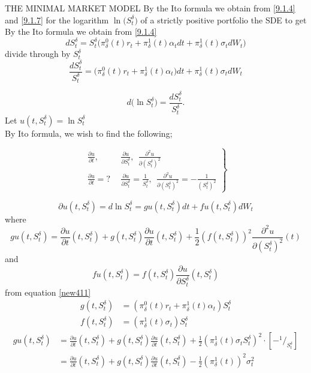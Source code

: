 \documentclass[unknownkeysallowed, compress]{beamer}
\newcommand*\rfrac[2]{{}^{#1}\!/_{#2}}
\theoremstyle{plain}
\begin{document}
\begin{frame}[allowframebreaks]{THE MINIMAL MARKET MODEL}
By the Ito formula we obtain from \eqref{9.1.4} and \eqref{9.1.7} for the logarithm $\ln\bigg(S_t^\delta\bigg)$ 
of a strictly positive portfolio the SDE to get
By the Ito formula we obtain from \eqref{9.1.4}
$$
dS_t^\delta = S_t^\delta\bigg(\pi_\delta^0(t)r_t+\pi_\delta^1(t)\alpha_tdt+\pi_\delta^1(t)\sigma_tdW_t\bigg)
$$
divide through by $S_t^\delta$
\begin{equation}\label{new411}
\frac{dS_t^\delta}{S_t^\delta} = \bigg(\pi_\delta^0(t)r_t+\pi^1_\delta(t)\alpha_t\bigg)dt+\pi_\delta^1(t)\sigma_tdW_t
\end{equation}

\begin{equation}
d\bigg(\ln S_t^\delta\bigg) =  \frac{dS_t^\delta}{S_t^\delta}.
\end{equation}
Let $u(t,S_t^\delta) = \ln S_t^\delta$\\
By Ito formula, we wish to find the following;

\begin{equation}
\left.
\begin{split}
\frac{\partial u}{\partial t},&~~\frac{\partial u}{\partial S_t^\delta},~~\frac{\partial^2u}{\partial(S_t^\delta)^2}\\
\frac{\partial u}{\partial t} = ? &~~\frac{\partial u}{\partial S_t^\delta} = \frac{1}{S_t^\delta},~~\frac{\partial^2u}{\partial(S_t^\delta)^2} = -\frac{1}{(S_t^\delta)^2}
\end{split}
\right\}
\end{equation}

\begin{equation}\label{new415}
\partial u(t,S_t^\delta) = d\ln S_t^\delta = gu(t,S_t^\delta)dt+fu(t,S_t^\delta)dW_t
\end{equation}
where
$$
gu(t,S_t^\delta) = \frac{\partial u}{\partial t}(t,S_t^\delta)+g(t,S_t^\delta)\frac{\partial u}{\partial t}(t,S_t^\delta)+\frac{1}{2}(f(t,S_t^\delta))^2\frac{\partial^2u}{\partial(S_t^\delta)^2}(t)
$$
and 
$$
fu(t,S_t^\delta) = f(t,S_t^\delta)\frac{\partial u}{\partial S_t^\delta}(t,S_t^\delta)
$$
from equation \eqref{new411}
\begin{align*}
g(t,S_t^\delta) & = (\pi^0_\delta(t)r_t+\pi_\delta^1(t)\alpha_t)S_t^\delta\\
f(t,S_t^\delta) & = (\pi^1_\delta(t)\sigma_t)S_t^\delta%
\end{align*}
\begin{equation}\label{new418}
\begin{split}
gu(t,S_t^\delta) & = \frac{\partial u}{\partial t}(t,S_t^\delta)+g(t,S_t^\delta)\frac{\partial u}{\partial t}(t,S_t^\delta)+\frac{1}{2}(\pi_\delta^1(t)\sigma_tS_t^\delta)^2\cdot [-\rfrac{1}{S_t^\delta}]\\
& = \frac{\partial u}{\partial t}(t,S_t^\delta)+g(t,S_t^\delta)\frac{\partial u}{\partial t}(t,S_t^\delta) - \frac{1}{2}(\pi_\delta^1(t))^2\sigma_t^2
\end{split}
\end{equation}



\end{frame}
\end{document}
